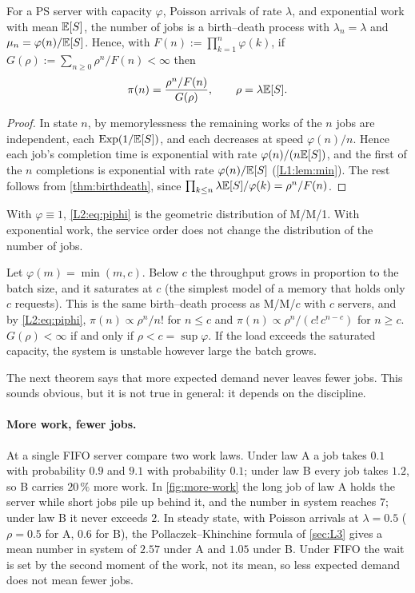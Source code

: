 \begin{proposition}\label{prop:phi}
For a PS server with capacity $\varphi$, Poisson arrivals of rate $\lambda$, and
exponential work with mean $\mathbb{E}[S]$, the number of jobs is a birth--death process with
$\lambda_n=\lambda$ and $\mu_n=\varphi(n)/\mathbb{E}[S]$. Hence, with
$F(n):=\prod_{k=1}^n\varphi(k)$, if $G(\rho):=\sum_{n\ge0}\rho^n/F(n)<\infty$ then
\begin{equation}\label{L2:eq:piphi}
  \pi(n)=\frac{\rho^n/F(n)}{G(\rho)},\qquad \rho=\lambda\mathbb{E}[S].
\end{equation}
\end{proposition}
\begin{proof}
In state $n$, by memorylessness the remaining works of the $n$ jobs are independent,
each $\mathrm{Exp}(1/\mathbb{E}[S])$, and each decreases at speed $\varphi(n)/n$.
Hence each job's completion time is exponential with rate $\varphi(n)/(n\mathbb{E}[S])$, and the
first of the $n$ completions is exponential with rate $\varphi(n)/\mathbb{E}[S]$
(\cref{L1:lem:min}). The rest follows from \cref{thm:birthdeath}, since
$\prod_{k\le n}\lambda\mathbb{E}[S]/\varphi(k)=\rho^n/F(n)$.
\end{proof}

With $\varphi\equiv1$, \eqref{L2:eq:piphi} is the geometric distribution of M/M/1. With
exponential work, the service order does not change the distribution of the number of
jobs.

\begin{example}\label{L2:ex:sat}
Let $\varphi(m)=\min(m,c)$. Below $c$ the throughput grows in proportion to the batch
size, and it saturates at $c$ (the simplest model of a memory that holds only $c$
requests). This is the same birth--death process as M/M/$c$ with $c$ servers, and by
\eqref{L2:eq:piphi}, $\pi(n)\propto\rho^n/n!$ for $n\le c$ and
$\pi(n)\propto\rho^n/(c!\,c^{n-c})$ for $n\ge c$.
$G(\rho)<\infty$ if and only if $\rho<c=\sup\varphi$. If the load exceeds the saturated
capacity, the system is unstable however large the batch grows.
\end{example}

The next theorem says that more expected demand never leaves fewer jobs. This sounds
obvious, but it is not true in general: it depends on the discipline.

\paragraph{More work, fewer jobs.} At a single FIFO server compare two work laws. Under
law A a job takes $0.1$ with probability $0.9$ and $9.1$ with probability $0.1$; under
law B every job takes $1.2$, so B carries $20\,\%$ more work. In \cref{fig:more-work}
the long job of law A holds the server while short jobs pile up behind it, and the
number in system reaches $7$; under law B it never exceeds $2$. In steady state, with
Poisson arrivals at $\lambda=0.5$ ($\rho=0.5$ for A, $0.6$ for B), the
Pollaczek--Khinchine formula of \cref{sec:L3} gives a mean number in system of $2.57$
under A and $1.05$ under B. Under FIFO the wait is set by the second moment of the work,
not its mean, so less expected demand does not mean fewer jobs.


